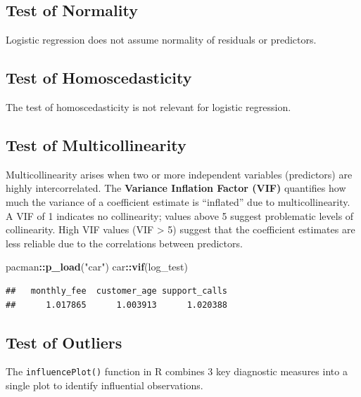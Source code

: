 \documentclass[
]{article}
\newenvironment{Shaded}{\begin{snugshade}}{\end{snugshade}}
\newcommand{\FunctionTok}[1]{\textcolor[rgb]{0.13,0.29,0.53}{\textbf{#1}}}
\newcommand{\NormalTok}[1]{#1}
\newcommand{\SpecialCharTok}[1]{\textcolor[rgb]{0.81,0.36,0.00}{\textbf{#1}}}
\newcommand{\StringTok}[1]{\textcolor[rgb]{0.31,0.60,0.02}{#1}}
\begin{document}
\subsection{Test of Normality}\label{test-of-normality}

Logistic regression does not assume normality of residuals or
predictors.

\subsection{Test of Homoscedasticity}\label{test-of-homoscedasticity}

The test of homoscedasticity is not relevant for logistic regression.

\subsection{Test of Multicollinearity}\label{test-of-multicollinearity}

Multicollinearity arises when two or more independent variables
(predictors) are highly intercorrelated. The \textbf{Variance Inflation
Factor (VIF)} quantifies how much the variance of a coefficient estimate
is ``inflated'' due to multicollinearity. A VIF of 1 indicates no
collinearity; values above 5 suggest problematic levels of collinearity.
High VIF values (VIF \textgreater{} 5) suggest that the coefficient
estimates are less reliable due to the correlations between predictors.

\begin{Shaded}
\begin{Highlighting}[]
\NormalTok{pacman}\SpecialCharTok{::}\FunctionTok{p\_load}\NormalTok{(}\StringTok{"car"}\NormalTok{)}
\NormalTok{car}\SpecialCharTok{::}\FunctionTok{vif}\NormalTok{(log\_test)}
\end{Highlighting}
\end{Shaded}

\begin{verbatim}
##   monthly_fee  customer_age support_calls 
##      1.017865      1.003913      1.020388
\end{verbatim}

\subsection{Test of Outliers}\label{test-of-outliers}

The \texttt{influencePlot()} function in R combines 3 key diagnostic
measures into a single plot to identify influential observations.
\end{document}
